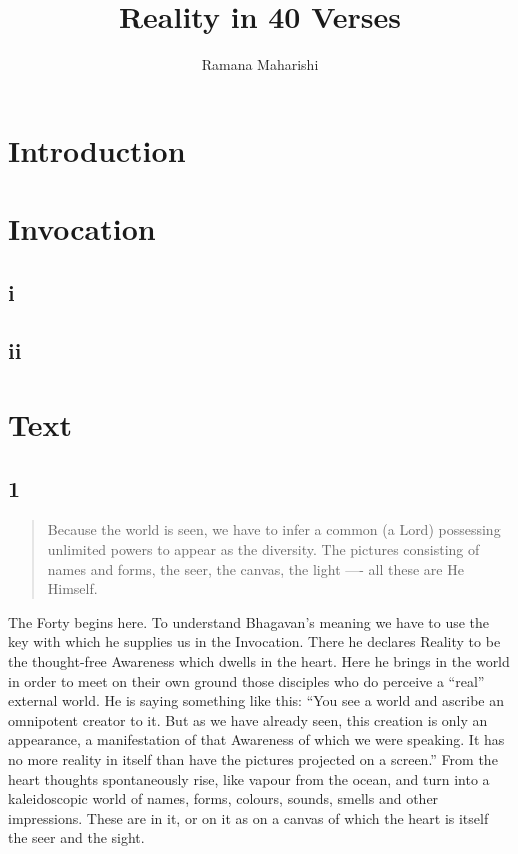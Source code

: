\documentclass[12pt]{report}
\begin{document}
\title{Reality in 40 Verses}
\author{Ramana Maharishi}
\maketitle


\tableofcontents

\chapter{Introduction}

\chapter{Invocation}

\section{i}
\section{ii}

\chapter{Text}


\section{1}

\begin{quote}
Because the world is seen, we have to infer a common (a Lord)
possessing unlimited powers to appear as the diversity. The pictures
consisting of names and forms, the seer, the canvas, the light ----
all these are He Himself.
\end{quote}


The Forty begins here. To understand Bhagavan's meaning we have to use
the key with which he supplies us in the Invocation. There he declares
Reality to be the thought-free Awareness which dwells in the
heart. Here he brings in the world in order to meet on their own
ground those disciples who do perceive a ``real'' external world. He
is saying something like this: ``You see a world and ascribe an
omnipotent creator to it. But as we have already seen, this creation
is only an appearance, a manifestation of that Awareness of which we
were speaking. It has no more reality in itself than have the pictures
projected on a screen.'' From the heart thoughts spontaneously rise,
like vapour from the ocean, and turn into a kaleidoscopic world of
names, forms, colours, sounds, smells and other impressions. These are
in it, or on it as on a canvas of which the heart is itself the seer
and the sight.
\end{document}
